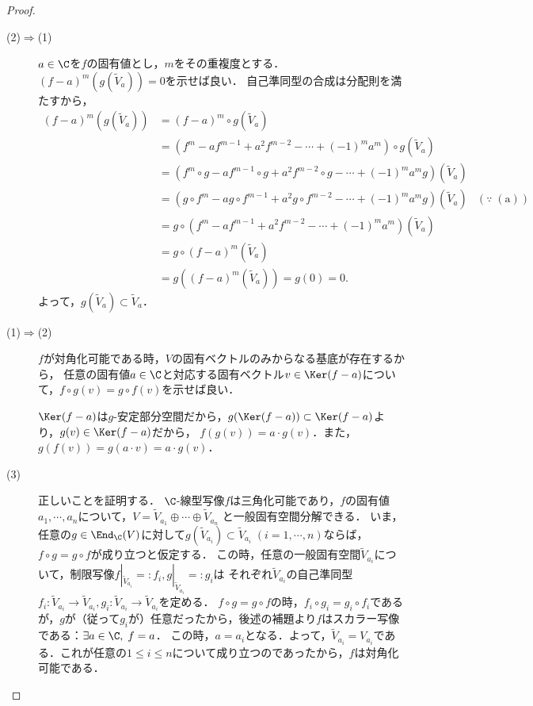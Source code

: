 \documentclass[uplatex, dvipdfmx]{jsreport}
\begin{document}
\begin{proof}
    \begin{description}
        \item[(2)$\Rightarrow$(1)] 
        $a\in\C$を$f$の固有値とし，$m$をその重複度とする．$(f-a)^m(g(\widetilde{V}_a))=0$を示せば良い．
        自己準同型の合成は分配則を満たすから，
        \begin{align*}
            (f-a)^m(g(\widetilde{V}_a))&=(f-a)^m\circ g(\widetilde{V}_a)\\
            &=(f^m-af^{m-1}+a^2f^{m-2}-\cdots+(-1)^ma^m)\circ g(\widetilde{V}_a)\\
            &=(f^m\circ g-af^{m-1}\circ g+a^2f^{m-2}\circ g-\cdots+(-1)^ma^mg)(\widetilde{V}_a)\\
            &=(g\circ f^m-ag\circ f^{m-1}+a^2 g\circ f^{m-2}-\cdots+(-1)^ma^mg)(\widetilde{V}_a)&(\because\;\mathrm{(a)})\\
            &=g\circ(f^m-af^{m-1}+a^2f^{m-2}-\cdots+(-1)^ma^m)(\widetilde{V}_a)\\
            &=g\circ(f-a)^m(\widetilde{V}_a)\\
            &=g((f-a)^m(\widetilde{V}_a))=g(0)=0.
        \end{align*}
        よって，$g(\widetilde{V}_a)\subset\widetilde{V}_a$．
        \item[(1)$\Rightarrow$(2)]
        $f$が対角化可能である時，$V$の固有ベクトルのみからなる基底が存在するから，
        任意の固有値$a\in\C$と対応する固有ベクトル$v\in\Ker(f-a)$について，$f\circ g(v)=g\circ f(v)$を示せば良い．
    
        $\Ker(f-a)$は$g$-安定部分空間だから，$g(\Ker(f-a))\subset\Ker(f-a)$より，$g(v)\in\Ker(f-a)$だから，
        $f(g(v))=a\cdot g(v)$．また，$g(f(v))=g(a\cdot v)=a\cdot g(v)$．
    
        \item[(3)]
        正しいことを証明する．
        $\C$-線型写像$f$は三角化可能であり，$f$の固有値$a_1,\cdots,a_n$について，$V=\widetilde{V}_{a_1}\oplus\cdots\oplus\widetilde{V}_{a_n}$
        と一般固有空間分解できる．
        いま，任意の$g\in\End_\C(V)$に対して$g(\widetilde{V}_{a_i})\subset\widetilde{V}_{a_i}\;(i=1,\cdots,n)$ならば，$f\circ g=g\circ f$が成り立つと仮定する．
        この時，任意の一般固有空間$\widetilde{V}_{a_i}$について，制限写像$f|_{\widetilde{V}_{a_i}}=:f_i,g|_{\widetilde{V}_{a_i}}=:g_i$は
        それぞれ$\widetilde{V}_{a_i}$の自己準同型$f_i:\widetilde{V}_{a_i}\to\widetilde{V}_{a_i},g_i:\widetilde{V}_{a_i}\to\widetilde{V}_{a_i}$を定める．
        $f\circ g=g\circ f$の時，$f_i\circ g_i=g_i\circ f_i$であるが，$g$が（従って$g_i$が）任意だったから，後述の補題より$f$はスカラー写像である：$\exists a\in\C,\;f=a$．
        この時，$a=a_i$となる．よって，$\widetilde{V}_{a_i}=V_{a_i}$である．これが任意の$1\le i\le n$について成り立つのであったから，$f$は対角化可能である．
    \end{description}
\end{proof}
\end{document}
